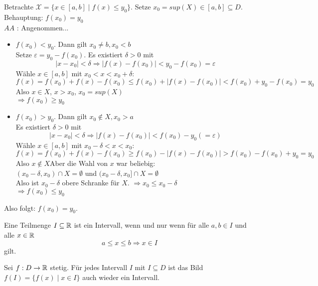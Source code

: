 \documentclass[main.tex]{subfiles}
\begin{document}
\begin{Beweis}
  Betrachte $\mathcal{X} = \{ x \in [a,b] \mid f(x)\leq y_0 \}$. Setze $x_0 = sup(X) \in [a,b] \subseteq D$.\\
  Behauptung: $f(x_0) = y_0$\\
  $A\!\!\!A$ : Angenommen...
  \begin{itemize}
    \item $f(x_0) < y_0$. Dann gilt $x_0 \neq b, x_0 < b$\\
    Setze $\varepsilon = y_0 - f(x_0)$. Es existiert $\delta > 0$ mit
    $$|x - x_0| < \delta \Rightarrow |f(x)-f(x_0)| < y_0 -f(x_0) = \varepsilon$$
    Wähle $x \in [a,b]$ mit $x_0 < x < x_0 + \delta$:
    $$f(x) = f(x_0) + f(x) - f(x_0)\leq f(x_0) + |f(x)-f(x_0)| < f(x_0) + y_0 - f(x_0) = y_0$$
    Also $x \in X$, $x > x_0$, $x_0 = sup(X)$ \lightning\\
    $\Rightarrow f(x_0) \geq y_0$
    \item $f(x_0) > y_0$. Dann gilt $x_0 \notin X, x_0 > a$\\
    Es existiert $\delta > 0$ mit
    $$|x - x_0| < \delta \Rightarrow |f(x)-f(x_0)| < f(x_0) - y_0 (= \varepsilon)$$
    Wähle $x \in [a,b]$ mit $x_0 - \delta< x < x_0$:
    $$f(x) = f(x_0) + f(x) - f(x_0) \geq f(x_0) - |f(x)-f(x_0)| > f(x_0) - f(x_0) + y_0 = y_0$$
    Also $x \notin X$Aber die Wahl von $x$ war beliebig:\\
    $(x_0 -\delta, x_0) \cap X = \emptyset$ und $(x_0 -\delta, x_0] \cap X = \emptyset$\\
    Also ist $x_0 - \delta$ obere Schranke für $X$. $\Rightarrow x_0 \leq x_0 - \delta$ \lightning\\
    $\Rightarrow f(x_0) \leq y_0$
  \end{itemize}
  Also folgt: $f(x_0) = y_0$.
\end{Beweis}

\begin{Bemerkung}[(Übung)]
  \begin{Theorem}
    Eine Teilmenge $I \subseteq \mathbb{R}$ ist ein Intervall, wenn und nur wenn für alle $a,b \in I$ und alle $x \in \mathbb{R}$
    $$a \leq x \leq b \Rightarrow x \in I$$
     gilt.
  \end{Theorem}
  \begin{Korollar}
    Sei $f: D \to \mathbb{R}$ stetig. Für jedes Intervall $I$ mit $I \subseteq D$ ist das Bild $f(I) = \{f(x) \mid x \in I \}$ auch wieder ein Intervall.
  \end{Korollar}
\end{Bemerkung}
\end{document}
